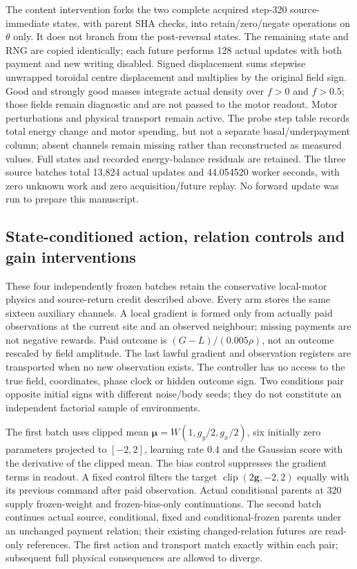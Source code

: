 The content intervention forks the two complete acquired step-320 source-immediate states, with parent SHA checks, into retain/zero/negate operations on $\theta$ only. It does not branch from the post-reversal states. The remaining state and RNG are copied identically; each future performs 128 actual updates with both payment and new writing disabled. Signed displacement sums stepwise unwrapped toroidal centre displacement and multiplies by the original field sign. Good and strongly good masses integrate actual density over $f>0$ and $f>0.5$; those fields remain diagnostic and are not passed to the motor readout. Motor perturbations and physical transport remain active. The probe step table records total energy change and motor spending, but not a separate basal/underpayment column; absent channels remain missing rather than reconstructed as measured values. Full states and recorded energy-balance residuals are retained. The three source batches total 13,824 actual updates and 44.054520 worker seconds, with zero unknown work and zero acquisition/future replay. No forward update was run to prepare this manuscript.

\subsection*{State-conditioned action, relation controls and gain interventions}
These four independently frozen batches retain the conservative local-motor physics and source-return credit described above. Every arm stores the same sixteen auxiliary channels. A local gradient is formed only from actually paid observations at the current site and an observed neighbour; missing payments are not negative rewards. Paid outcome is $(G-L)/(0.005\rho)$, not an outcome rescaled by field amplitude. The last lawful gradient and observation registers are transported when no new observation exists. The controller has no access to the true field, coordinates, phase clock or hidden outcome sign. Two conditions pair opposite initial signs with different noise/body seeds; they do not constitute an independent factorial sample of environments.

The first batch uses clipped mean $\boldsymbol\mu=W(1,g_y/2,g_x/2)$, six initially zero parameters projected to $[-2,2]$, learning rate $0.4$ and the Gaussian score with the derivative of the clipped mean. The bias control suppresses the gradient terms in readout. A fixed control filters the target $\operatorname{clip}(2\boldsymbol g,-2,2)$ equally with its previous command after paid observation. Actual conditional parents at 320 supply frozen-weight and frozen-bias-only continuations. The second batch continues actual source, conditional, fixed and conditional-frozen parents under an unchanged payment relation; their existing changed-relation futures are read-only references. The first action and transport match exactly within each pair; subsequent full physical consequences are allowed to diverge.

